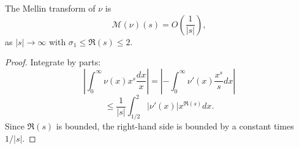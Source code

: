 \begin{theorem}[MellinOfPsi]
\label{MellinOfPsi}
\leanok
The Mellin transform of $\nu$ is
  $$\mathcal{M}(\nu)(s) =  O\left(\frac{1}{|s|}\right),$$
  as $|s|\to\infty$ with $\sigma_1 \le \Re(s) \le 2$.
\end{theorem}
\begin{proof}
\leanok
Integrate by parts:
  $$
  \left|\int_0^\infty \nu(x)x^s\frac{dx}{x}\right| =
  \left|-\int_0^\infty \nu'(x)\frac{x^{s}}{s}dx\right|
  $$
  $$
  \le \frac{1}{|s|} \int_{1/2}^2|\nu'(x)|x^{\Re(s)}dx.
  $$
  Since $\Re(s)$ is bounded, the right-hand side is bounded by a
  constant times $1/|s|$.
\end{proof}
